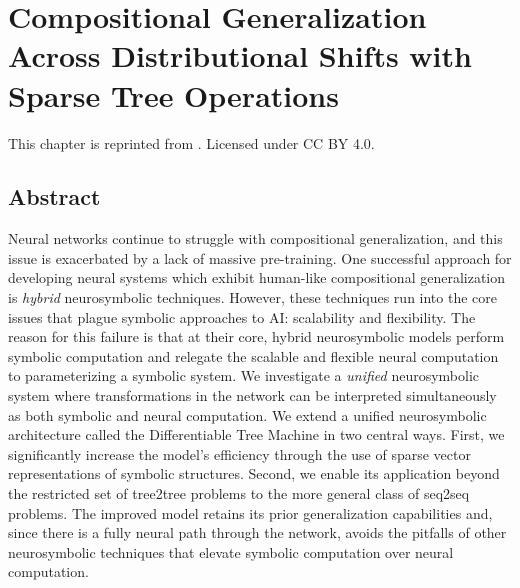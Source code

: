 \newcommand{\dtm}[0]{\texttt{DTM}\xspace}
\newcommand{\sdtm}[0]{\texttt{sDTM}\xspace}
\newcommand{\fullrepname}{Sparse Coordinate Trees\xspace}
\newcommand{\abvrepname}{SCT\xspace}
\renewcommand{\car}{\texttt{car}\xspace}
\renewcommand{\cdr}{\texttt{cdr}\xspace}
\renewcommand{\cons}{\texttt{cons}\xspace}
\newcommand{\leftcommand}{\texttt{left}\xspace}
\newcommand{\rightcommand}{\texttt{right}\xspace}

\chapter{Compositional Generalization Across Distributional Shifts with Sparse Tree Operations} \label{chap:chap-3}


\begin{singlespace}         %
    This chapter is reprinted from . Licensed under CC BY 4.0.
\end{singlespace} 

\section{Abstract}
    Neural networks continue to struggle with compositional generalization, and this issue is exacerbated by a lack of massive pre-training. One successful approach for developing neural systems which exhibit human-like compositional generalization is \textit{hybrid} neurosymbolic techniques. However, these techniques run into the core issues that plague symbolic approaches to AI: scalability and flexibility. The reason for this failure is that at their core, hybrid neurosymbolic models perform symbolic computation and relegate the scalable and flexible neural computation to parameterizing a symbolic system. We investigate a \textit{unified} neurosymbolic system where transformations in the network can be interpreted simultaneously as both symbolic and neural computation. We extend a unified neurosymbolic architecture called the Differentiable Tree Machine in two central ways. First, we significantly increase the model’s efficiency through the use of sparse vector representations of symbolic structures. Second, we enable its application beyond the restricted set of tree2tree problems to the more general class of seq2seq problems. The improved model retains its prior generalization capabilities and, since there is a fully neural path through the network, avoids the pitfalls of other neurosymbolic techniques that elevate symbolic computation over neural computation.

